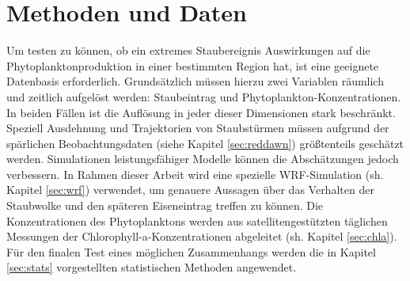 \documentclass[12pt,a4paper,onecolumn]{scrartcl}
\begin{document}
\section{Methoden und Daten} \label{sec:Methoden}
Um testen zu können, ob ein extremes Staubereignis Auswirkungen auf die Phytoplanktonproduktion in einer bestimmten Region hat, ist eine geeignete Datenbasis erforderlich. Grundsätzlich müssen hierzu zwei Variablen räumlich und zeitlich aufgelöst werden: Staubeintrag und Phytoplankton-Konzentrationen. In beiden Fällen ist die Auflösung in jeder dieser Dimensionen stark beschränkt. Speziell Ausdehnung und Trajektorien von Staubstürmen müssen aufgrund der spärlichen Beobachtungsdaten (siehe Kapitel  \ref{sec:reddawn}) größtenteils geschätzt werden. Simulationen leistungsfähiger Modelle können die Abschätzungen jedoch verbessern. In Rahmen dieser Arbeit wird eine spezielle WRF-Simulation (sh. Kapitel \ref{sec:wrf}) verwendet, um genauere Aussagen über das Verhalten der Staubwolke und den späteren Eiseneintrag treffen zu können. Die Konzentrationen des Phytoplanktons werden aus satellitengestützten täglichen Messungen der Chlorophyll-a-Konzentrationen abgeleitet (sh. Kapitel \ref{sec:chla}). Für den finalen Test eines möglichen Zusammenhangs werden die in Kapitel \ref{sec:stats} vorgestellten statistischen Methoden angewendet.
\end{document}
